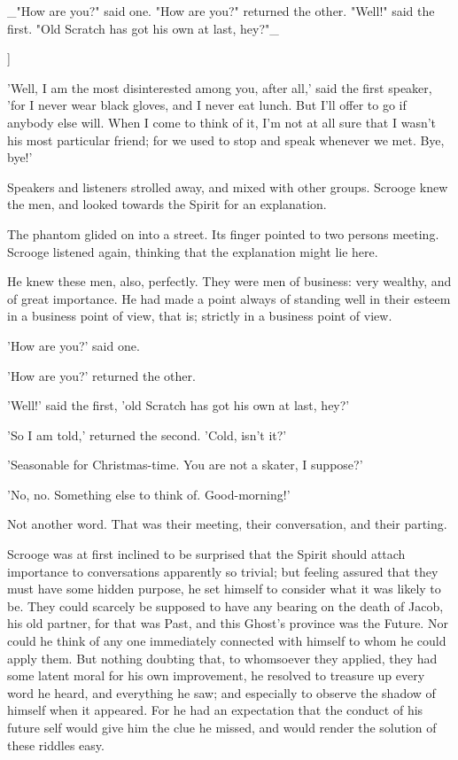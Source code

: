   _"How are you?" said one.
   "How are you?" returned the other.
   "Well!" said the first. "Old Scratch has got his own at last, hey?"_

]

'Well, I am the most disinterested among you, after all,' said the first
speaker, 'for I never wear black gloves, and I never eat lunch. But I'll
offer to go if anybody else will. When I come to think of it, I'm not
at all sure that I wasn't his most particular friend; for we used to
stop and speak whenever we met. Bye, bye!'

Speakers and listeners strolled away, and mixed with other groups.
Scrooge knew the men, and looked towards the Spirit for an explanation.

The phantom glided on into a street. Its finger pointed to two persons
meeting. Scrooge listened again, thinking that the explanation might lie
here.

He knew these men, also, perfectly. They were men of business: very
wealthy, and of great importance. He had made a point always of standing
well in their esteem in a business point of view, that is; strictly in a
business point of view.

'How are you?' said one.

'How are you?' returned the other.

'Well!' said the first, 'old Scratch has got his own at last, hey?'

'So I am told,' returned the second. 'Cold, isn't it?'

'Seasonable for Christmas-time. You are not a skater, I suppose?'

'No, no. Something else to think of. Good-morning!'

Not another word. That was their meeting, their conversation, and their
parting.

Scrooge was at first inclined to be surprised that the Spirit should
attach importance to conversations apparently so trivial; but feeling
assured that they must have some hidden purpose, he set himself to
consider what it was likely to be. They could scarcely be supposed to
have any bearing on the death of Jacob, his old partner, for that was
Past, and this Ghost's province was the Future. Nor could he think of
any one immediately connected with himself to whom he could apply them.
But nothing doubting that, to whomsoever they applied, they had some
latent moral for his own improvement, he resolved to treasure up every
word he heard, and everything he saw; and especially to observe the
shadow of himself when it appeared. For he had an expectation that the
conduct of his future self would give him the clue he missed, and would
render the solution of these riddles easy.

